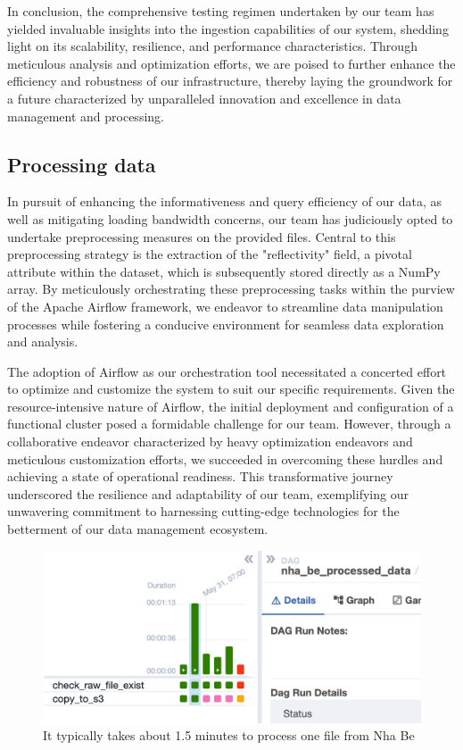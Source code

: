 In conclusion, the comprehensive testing regimen undertaken by our team has
yielded invaluable insights into the ingestion capabilities of our system,
shedding light on its scalability, resilience, and performance characteristics.
Through meticulous analysis and optimization efforts, we are poised to further
enhance the efficiency and robustness of our infrastructure, thereby laying the
groundwork for a future characterized by unparalleled innovation and excellence
in data management and processing.


\subsection{Processing data}

In pursuit of enhancing the informativeness and query efficiency of our data, as
well as mitigating loading bandwidth concerns, our team has judiciously opted to
undertake preprocessing measures on the provided files. Central to this
preprocessing strategy is the extraction of the "reflectivity" field, a pivotal
attribute within the dataset, which is subsequently stored directly as a NumPy
array. By meticulously orchestrating these preprocessing tasks within the
purview of the Apache Airflow framework, we endeavor to streamline data
manipulation processes while fostering a conducive environment for seamless data
exploration and analysis.

The adoption of Airflow as our orchestration tool necessitated a concerted
effort to optimize and customize the system to suit our specific requirements.
Given the resource-intensive nature of Airflow, the initial deployment and
configuration of a functional cluster posed a formidable challenge for our team.
However, through a collaborative endeavor characterized by heavy optimization
endeavors and meticulous customization efforts, we succeeded in overcoming these
hurdles and achieving a state of operational readiness. This transformative
journey underscored the resilience and adaptability of our team, exemplifying
our unwavering commitment to harnessing cutting-edge technologies for the
betterment of our data management ecosystem.

\begin{figure}[H]
    \centering
    \includegraphics[width=0.8\linewidth]{Images/5-etl-data.png}
    \vspace{1cm}
    \caption{It typically takes about 1.5 minutes to process one file from Nha Be}
    \label{fig:etl-data}
\end{figure}


